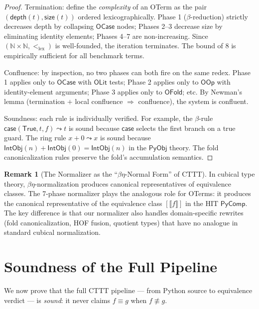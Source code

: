 \documentclass[11pt,a4paper]{report}
\theoremstyle{definition}
\newtheorem{remark}[definition]{Remark}
\theoremstyle{plain}
\newcommand{\den}[1]{\llbracket #1 \rrbracket}
\begin{document}
\begin{proof}
Termination: define the \emph{complexity} of an OTerm as the pair
$(\mathsf{depth}(t), \mathsf{size}(t))$ ordered lexicographically.
Phase 1 ($\beta$-reduction) strictly decreases depth by collapsing
$\mathsf{OCase}$ nodes; Phases 2--3 decrease size by eliminating
identity elements; Phases 4--7 are non-increasing.  Since
$(\mathbb{N} \times \mathbb{N}, <_{\mathrm{lex}})$ is well-founded,
the iteration terminates.  The bound of 8 is empirically sufficient
for all benchmark terms.

Confluence: by inspection, no two phases can both fire on the same
redex.  Phase 1 applies only to $\mathsf{OCase}$ with
$\mathsf{OLit}$ tests; Phase 2 applies only to $\mathsf{OOp}$ with
identity-element arguments; Phase 3 applies only to
$\mathsf{OFold}$; etc.  By Newman's lemma (termination $+$ local
confluence $\Rightarrow$ confluence), the system is confluent.

Soundness: each rule is individually verified.  For example, the
$\beta$-rule $\mathsf{case}(\mathsf{True}, t, f) \leadsto t$ is
sound because $\mathsf{case}$ selects the first branch on a true
guard.  The ring rule $x + 0 \leadsto x$ is sound because
$\mathsf{IntObj}(n) + \mathsf{IntObj}(0) = \mathsf{IntObj}(n)$ in
the $\mathsf{PyObj}$ theory.  The fold canonicalization rules
preserve the fold's accumulation semantics.
\end{proof}

\begin{remark}[The Normalizer as the ``$\beta\eta$-Normal Form'' of CTTT]
In cubical type theory, $\beta\eta$-normalization produces canonical
representatives of equivalence classes.  The 7-phase normalizer plays
the analogous role for OTerms: it produces the canonical representative
of the equivalence class $[\den{f}]$ in the HIT $\mathsf{PyComp}$.
The key difference is that our normalizer also handles domain-specific
rewrites (fold canonicalization, HOF fusion, quotient types) that have
no analogue in standard cubical normalization.
\end{remark}

\section{Soundness of the Full Pipeline}
\label{sec:pipeline-sound}

We now prove that the full CTTT pipeline --- from Python source to
equivalence verdict --- is \emph{sound}: it never claims
$f \equiv g$ when $f \not\equiv g$.
\end{document}
